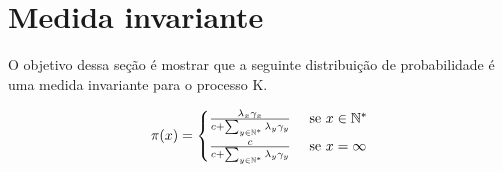 
\section{Medida invariante}
\label{sec:invariante}

O objetivo dessa seção é mostrar que a seguinte distribuição de
probabilidade é uma medida invariante para o processo K.

\begin{equation}
  \label{eq:invariante}
  \pi(x) = \begin{cases}
    \frac{\lambda_x \gamma_x}{c + \sum_{y \in {\mathbb{N^*}}} \lambda_y \gamma_y}
    & \textrm{ se } x \in {\mathbb{N^*}} \\
    \frac{c}{c + \sum_{y \in {\mathbb{N^*}}} \lambda_y \gamma_y}
    & \textrm{ se } x = \infty \\
  \end{cases}
\end{equation}

